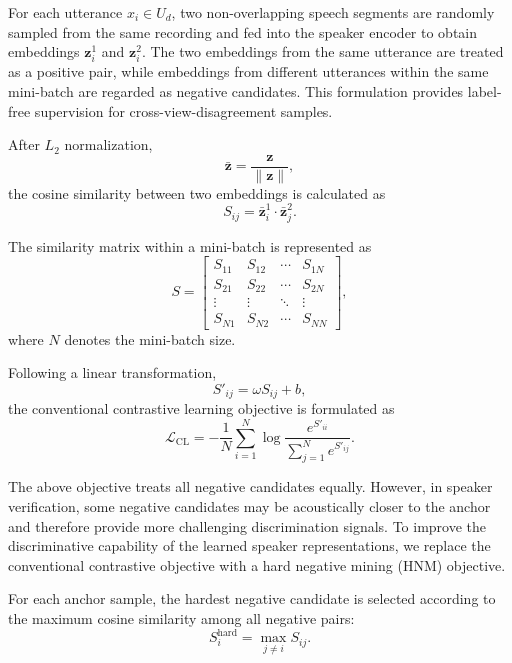\documentclass[journal]{IEEEtran}
\begin{document}
For each utterance $x_i\in U_d$, two non-overlapping speech segments
are randomly sampled from the same recording and fed into the speaker
encoder to obtain embeddings $\mathbf{z}_i^1$ and $\mathbf{z}_i^2$.
The two embeddings from the same utterance are treated as a positive
pair, while embeddings from different utterances within the same
mini-batch are regarded as negative candidates.
This formulation provides label-free supervision for cross-view-disagreement samples.

After $L_2$ normalization,
\begin{equation}
\bar{\mathbf{z}}
=
\frac{\mathbf{z}}{\|\mathbf{z}\|},
\end{equation}
the cosine similarity between two embeddings is calculated as
\begin{equation}
S_{ij}
=
\bar{\mathbf{z}}_i^1
\cdot
\bar{\mathbf{z}}_j^2 .
\end{equation}

The similarity matrix within a mini-batch is represented as
\begin{equation}
S=
\begin{bmatrix}
S_{11} & S_{12} & \cdots & S_{1N} \\
S_{21} & S_{22} & \cdots & S_{2N} \\
\vdots & \vdots & \ddots & \vdots \\
S_{N1} & S_{N2} & \cdots & S_{NN}
\end{bmatrix},
\end{equation}
where $N$ denotes the mini-batch size.

Following a linear transformation,
\begin{equation}
S'_{ij}
=
\omega S_{ij}+b,
\end{equation}
the conventional contrastive learning objective is formulated as
\begin{equation}
\mathcal{L}_{\mathrm{CL}}
=
-\frac{1}{N}
\sum_{i=1}^{N}
\log
\frac{
e^{S'_{ii}}
}{
\sum_{j=1}^{N}e^{S'_{ij}}
}.
\end{equation}

The above objective treats all negative candidates equally.
However, in speaker verification, some negative candidates may be
acoustically closer to the anchor and therefore provide more
challenging discrimination signals.
To improve the discriminative capability of the learned speaker
representations, we replace the conventional contrastive objective with
a hard negative mining (HNM) objective.

For each anchor sample, the hardest negative candidate is selected
according to the maximum cosine similarity among all negative pairs:
\begin{equation}
S_i^{\mathrm{hard}}
=
\max_{j\neq i}
S_{ij}.
\end{equation}
\end{document}

